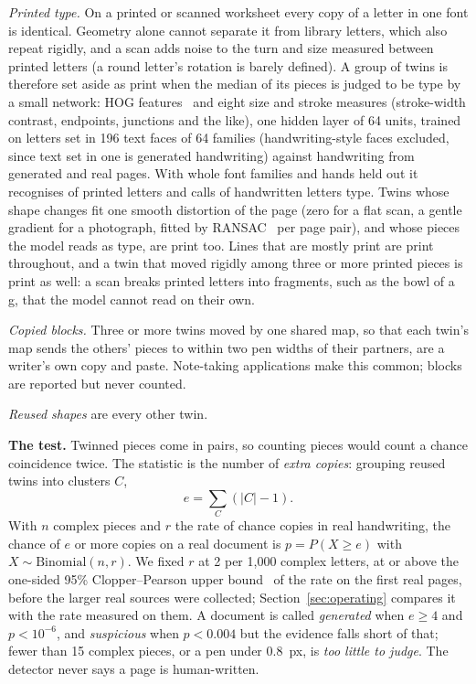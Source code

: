 \documentclass[conference]{IEEEtran}
\begin{document}
\emph{Printed type.} On a printed or scanned worksheet every copy of a letter in one font is identical. Geometry alone
cannot separate it from library letters, which also repeat rigidly, and a scan adds noise to the turn and size measured
between printed letters (a round letter's rotation is barely defined). A group of twins is therefore set aside as print
when the median of its pieces is judged to be type by a small network: HOG features~\cite{dalal2005hog} and eight size
and stroke measures (stroke-width contrast, endpoints, junctions and the like), one hidden layer of 64 units, trained on letters set in 196 text faces of 64 families (handwriting-style faces
excluded, since text set in one is generated handwriting) against handwriting from generated and real pages. With whole
font families and hands held out it recognises \PrintRecall{} of printed letters and calls \PrintFalse{} of handwritten
letters type. Twins whose shape changes fit one smooth distortion of the page (zero for a flat scan, a gentle gradient
for a photograph, fitted by RANSAC~\cite{fischler1981ransac} per page pair), and whose pieces the model reads as type,
are print too. Lines that are mostly print are print throughout, and a twin that moved rigidly among three or more
printed pieces is print as well: a scan breaks printed letters into fragments, such as the bowl of a g, that the model
cannot read on their own.

\emph{Copied blocks.} Three or more twins moved by one shared map, so that each twin's map sends the others' pieces to
within two pen widths of their partners, are a writer's own copy and paste. Note-taking applications make this common;
blocks are reported but never counted.

\emph{Reused shapes} are every other twin.

\textbf{The test.} Twinned pieces come in pairs, so counting pieces would count a chance coincidence twice. The
statistic is the number of \emph{extra copies}: grouping reused twins into clusters $C$,
\begin{equation}
e = \sum_{C} \left(\lvert C\rvert - 1\right).
\end{equation}
With $n$ complex pieces and $r$ the rate of chance copies in real handwriting, the chance of $e$ or more copies on a
real document is $p = P(X \ge e)$ with $X\sim\mathrm{Binomial}(n, r)$. We fixed $r$ at 2 per 1{,}000 complex letters,
at or above the one-sided 95\% Clopper--Pearson upper bound~\cite{clopper1934} of the rate on the first real pages, before
the larger real sources were collected; Section~\ref{sec:operating} compares it with the rate measured on them. A
document is called \emph{generated} when $e \ge 4$ and $p < 10^{-6}$, and \emph{suspicious} when $p < 0.004$ but the
evidence falls short of that; fewer than 15 complex pieces, or a pen under 0.8~px, is \emph{too little to judge}. The
detector never says a page is human-written.
\end{document}
